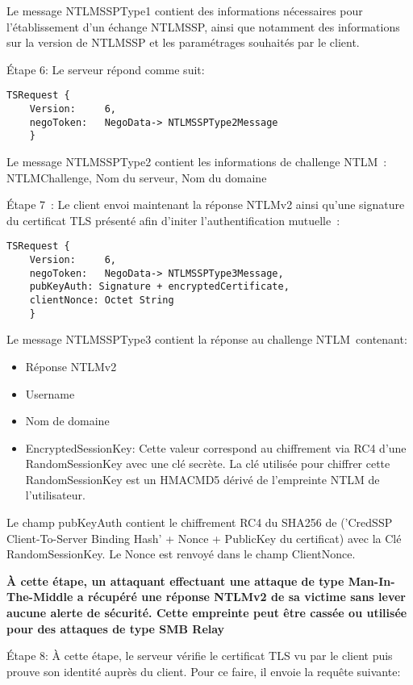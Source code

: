 Le message NTLMSSPType1 contient des informations nécessaires pour l’établissement d’un échange NTLMSSP, ainsi que notamment des informations sur la version de NTLMSSP et les paramétrages souhaités par le client.

Étape 6: Le serveur répond comme suit:

\begin{lstlisting}[frame=single,basicstyle=\tiny]
TSRequest {
	Version:     6,
	negoToken:   NegoData-> NTLMSSPType2Message
	}
\end{lstlisting}


Le message NTLMSSPType2 contient les informations de challenge NTLM : NTLMChallenge, Nom du serveur, Nom du domaine

Étape 7 :
Le client envoi maintenant la réponse NTLMv2 ainsi qu'une signature du certificat TLS présenté afin d'initer l'authentification mutuelle :

\begin{lstlisting}[frame=single,basicstyle=\tiny]
TSRequest {
	Version:     6,
	negoToken:   NegoData-> NTLMSSPType3Message,
	pubKeyAuth: Signature + encryptedCertificate,
	clientNonce: Octet String
	}
\end{lstlisting}

Le message NTLMSSPType3 contient la réponse au challenge NTLM contenant:
\begin{itemize}
	\item Réponse NTLMv2
	\item Username
	\item Nom de domaine
	\item EncryptedSessionKey: Cette valeur correspond au chiffrement via RC4 d’une RandomSessionKey avec une clé secrète. La clé utilisée pour chiffrer cette RandomSessionKey est un HMACMD5 dérivé de l'empreinte NTLM de l’utilisateur.
\end{itemize}
Le champ pubKeyAuth contient le chiffrement RC4 du SHA256 de (’CredSSP Client-To-Server Binding Hash’ + Nonce + PublicKey du certificat) avec la Clé RandomSessionKey.
Le Nonce est renvoyé dans le champ ClientNonce.

\textbf{À cette étape, un attaquant effectuant une attaque de type Man-In-The-Middle a récupéré une réponse NTLMv2 de sa victime sans lever aucune alerte de sécurité. Cette empreinte peut être cassée ou utilisée pour des attaques de type SMB Relay}

Étape 8: À cette étape, le serveur vérifie le certificat TLS vu par le client puis prouve son identité auprès du client. Pour ce faire, il envoie la requête suivante:

